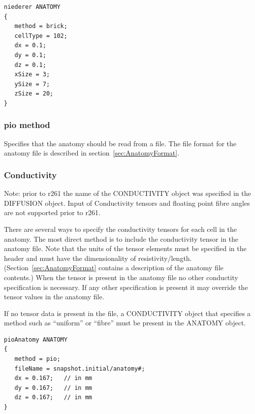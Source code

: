 \documentclass{article}
\begin{document}
\begin{verbatim}
niederer ANATOMY 
{
   method = brick;
   cellType = 102;
   dx = 0.1;
   dy = 0.1;
   dz = 0.1;
   xSize = 3; 
   ySize = 7;
   zSize = 20;
}
\end{verbatim}

\subsubsection{pio method}

Specifies that the anatomy should be read from a file.    The file format for the anatomy file is described in
section~\ref{sec:AnatomyFormat}. 
\begin{keywords}
\end{keywords}

\subsubsection{Conductivity}
Note: prior to r261 the name of the CONDUCTIVITY object was specified in
the DIFFUSION object.  Input of Conductivity tensors and floating point
fibre angles are not supported prior to r261.

There are several ways to specify the conductivity tensors for each cell
in the anatomy.  The most direct method is to include the conductivity
tensor in the anatomy file.  Note that the units of the tensor elements
must be specified in the header and must have the dimensionality of
resistivity/length.  (Section~\ref{sec:AnatomyFormat} contains a description
of the anatomy file contents.)  When the tensor is present in the
anatomy file no other conductity specification is necessary.  If any
other specification is present it may override the tensor values in the
anatomy file.

If no tensor data is present in the file, a CONDUCTIVITY object that
specifies a method such as ``uniform'' or ``fibre'' must be present in
the ANATOMY object.



\begin{verbatim}
pioAnatomy ANATOMY 
{
   method = pio;
   fileName = snapshot.initial/anatomy#;
   dx = 0.167;   // in mm
   dy = 0.167;   // in mm
   dz = 0.167;   // in mm
}
\end{verbatim}
\end{document}
